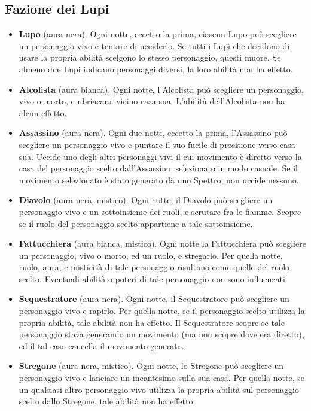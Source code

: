 \documentclass[a4paper,10pt]{article}
\begin{document}
\subsection*{Fazione dei Lupi}

\begin{itemize}
	
	\item {\bf Lupo} (aura nera). Ogni notte, eccetto la prima, ciascun Lupo può scegliere un personaggio vivo e tentare di ucciderlo. Se tutti i Lupi che decidono di usare la propria abilità scelgono lo stesso personaggio, questi muore. Se almeno due Lupi indicano personaggi diversi, la loro abilità non ha effetto.
	
	\item {\bf Alcolista} (aura bianca). Ogni notte, l'Alcolista può scegliere un personaggio, vivo o morto, e ubriacarsi vicino casa sua. L'abilità dell'Alcolista non ha alcun effetto.
	
	\item {\bf Assassino} (aura nera). Ogni due notti, eccetto la prima, l'Assassino può scegliere un personaggio vivo e puntare il suo fucile di precisione verso casa sua. Uccide uno degli altri personaggi vivi il cui movimento è diretto verso la casa del personaggio scelto dall'Assassino, selezionato in modo casuale. Se il movimento selezionato è stato generato da uno Spettro, non uccide nessuno.

	\item {\bf Diavolo} (aura nera, mistico). Ogni notte, il Diavolo può scegliere un personaggio vivo e un sottoinsieme dei ruoli, e scrutare fra le fiamme. Scopre se il ruolo del personaggio scelto appartiene a tale sottoinsieme.
 
	\item {\bf Fattucchiera} (aura bianca, mistico). Ogni notte la Fattucchiera può scegliere un personaggio, vivo o morto, ed un ruolo, e stregarlo. Per quella notte, ruolo, aura, e misticità di tale personaggio risultano come quelle del ruolo scelto. Eventuali abilità o poteri di tale personaggio non sono influenzati.

	\item {\bf Sequestratore} (aura nera). Ogni notte, il Sequestratore può scegliere un personaggio vivo e rapirlo. Per quella notte, se il personaggio scelto utilizza la propria abilità, tale abilità non ha effetto. Il Sequestratore scopre se tale personaggio stava generando un movimento (ma non scopre dove era diretto), ed il tal caso cancella il movimento generato.
	
	\item {\bf Stregone} (aura nera, mistico). Ogni notte, lo Stregone può scegliere un personaggio vivo e lanciare un incantesimo sulla sua casa. Per quella notte, se un qualsiasi altro personaggio vivo utilizza la propria abilità sul personaggio scelto dallo Stregone, tale abilità non ha effetto.
 
\end{itemize}
\end{document}

